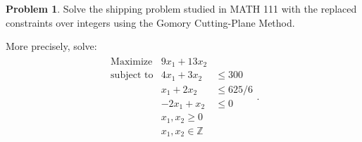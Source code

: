\documentclass[12pt]{article}
\theoremstyle{definition}
\newtheorem{problem}{Problem}
\begin{document}
\begin{problem}
  Solve the shipping problem studied in MATH 111 with the replaced constraints over integers using the
  Gomory Cutting-Plane Method.

  More precisely, solve:
  \begin{align*}
    \begin{array}{lrl}
      \text{Maximize} & 9x_1 + 13x_2 & \\
      \text{subject to} & 4x_1 + 3x_2 &\leq 300 \\
       & x_1 + 2x_2 &\leq 625/6 \\
       & -2x_1 + x_2 &\leq 0 \\
       & x_1, x_2 \geq 0 & \\
       & x_1, x_2 \in \mathbb{Z}&
    \end{array}.
  \end{align*}
\end{problem}
\end{document}

